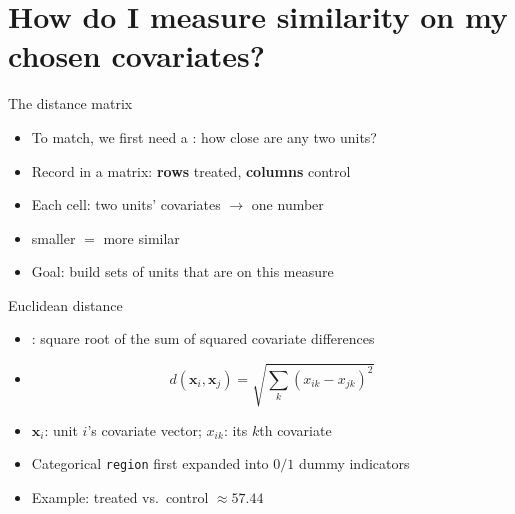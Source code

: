 \documentclass[table, xcolor = {dvipsnames}, 9pt]{beamer}
\theoremstyle{plain}
\newcommand{\mh}[1]{{\color{magenta}{#1}}}
\begin{document}
\section{How do I measure similarity on my chosen covariates?}

\begin{frame}[t]{The distance matrix}
\vfill
\begin{itemize} \vfill
\item To match, we first need a \mh{distance}: how close are any two units? \vfill
\item Record in a matrix: \textbf{rows} treated, \textbf{columns} control \vfill
\item Each cell: two units' covariates $\to$ one \mh{nonnegative} number \vfill
\item[] smaller $=$ more similar \citep{rubinwaterman2006} \vfill
\item Goal: build sets of units that are \mh{close} on this measure \vfill
\end{itemize} \vfill
\end{frame}
\begin{frame}[t]{Euclidean distance}
\vfill
\begin{itemize} \vfill
\item \mh{Euclidean}: square root of the sum of squared covariate differences \vfill
\item[]
\begin{equation*}
d(\bm{x}_i, \bm{x}_j) = \sqrt{\sum_{k} (x_{ik} - x_{jk})^2}
\end{equation*} \vfill
\item $\bm{x}_i$: unit $i$'s covariate vector; $x_{ik}$: its $k$th covariate \vfill
\item Categorical \texttt{region} first expanded into $0/1$ dummy indicators \vfill
\item Example: treated \mh{Liberia} vs.\ control \mh{Guinea-Bissau} $\approx 57.44$ \vfill
\end{itemize} \vfill
\end{frame}
\end{document}
